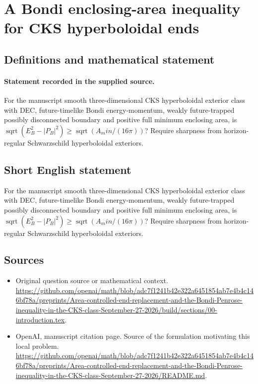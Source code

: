\documentclass[11pt]{article}
\begin{document}
\section*{A Bondi enclosing-area inequality for CKS hyperboloidal ends}\label{30007217}
\subsection{Definitions and mathematical statement}
\paragraph{Statement recorded in the supplied source.}
For the manuscript smooth three-dimensional CKS hyperboloidal exterior class with DEC, future-timelike Bondi energy-momentum, weakly future-trapped possibly disconnected boundary and positive full minimum enclosing area, is $\operatorname{sqrt}(E_B^2-|P_B|^2)\geq \operatorname{sqrt}(A_min/(16\pi ))$? Require sharpness from horizon-regular Schwarzschild hyperboloidal exteriors.
\subsection{Short English statement}
For the manuscript smooth three-dimensional CKS hyperboloidal exterior class with DEC, future-timelike Bondi energy-momentum, weakly future-trapped possibly disconnected boundary and positive full minimum enclosing area, is $\operatorname{sqrt}(E_B^2-|P_B|^2)\geq \operatorname{sqrt}(A_min/(16\pi ))$? Require sharpness from horizon-regular Schwarzschild hyperboloidal exteriors.
\subsection{Sources}
\begin{itemize}
\item[S1] Original question source or mathematical context.
\url{https://github.com/openai/math/blob/adc7f1241b42e322a6451854ab7e4b4c146bf78a/preprints/Area-controlled-end-replacement-and-the-Bondi-Penrose-inequality-in-the-CKS-class-September-27-2026/build/sections/00-introduction.tex}.
\item[S2] OpenAI, manuscript citation page. Source of the formulation motivating this local problem.
\url{https://github.com/openai/math/blob/adc7f1241b42e322a6451854ab7e4b4c146bf78a/preprints/Area-controlled-end-replacement-and-the-Bondi-Penrose-inequality-in-the-CKS-class-September-27-2026/README.md}.
\end{itemize}
\end{document}
